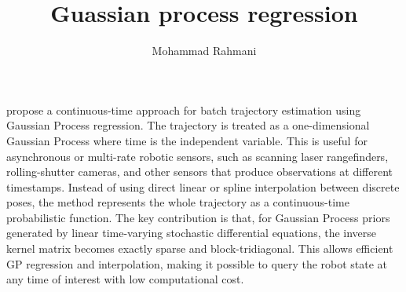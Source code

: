 \documentclass[a4paper]{article}
\title{Guassian process regression}
\date{}
\author{Mohammad Rahmani}
\begin{document}
    \maketitle
    \cite{barfoot-2014-batch-continuous-time-trajectory-estimation-as-exactly-sparse-gaussian-process-regression} propose a continuous-time approach for batch trajectory estimation using Gaussian Process regression. The trajectory is treated as a one-dimensional Gaussian Process where time is the independent variable. This is useful for asynchronous or multi-rate robotic sensors, such as scanning laser rangefinders, rolling-shutter cameras, and other sensors that produce observations at different timestamps. Instead of using direct linear or spline interpolation between discrete poses, the method represents the whole trajectory as a continuous-time probabilistic function. The key contribution is that, for Gaussian Process priors generated by linear time-varying stochastic differential equations, the inverse kernel matrix becomes exactly sparse and block-tridiagonal. This allows efficient GP regression and interpolation, making it possible to query the robot state at any time of interest with low computational cost.
    
    
\end{document}
